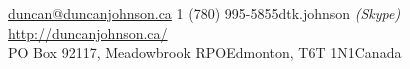 \documentclass[10pt,letterpaper]{article} %
\begin{document}
 



\noindent\href{mailto:duncan@duncanjohnson.ca}{duncan@duncanjohnson.ca}\bull %
\textsmaller{+}1 (780) 995-5855\bull dtk.johnson \textit{(Skype)}\bull %
\href{http://duncanjohnson.ca/}{http://duncanjohnson.ca/}\\ %
PO Box 92117, Meadowbrook RPO\bull Edmonton, \bull T6T 1N1\bull Canada %

\spacedhrule{0.9em}{-0.4em} %



\vspace{-1.3em} %
\end{document}
